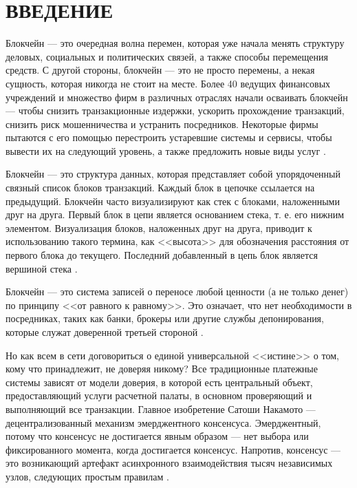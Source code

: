 \documentclass{bmstu}
\begin{document}
{\centering \chapter*{ВВЕДЕНИЕ}}

Блокчейн --- это очередная волна перемен, которая уже начала менять структуру
деловых, социальных и политических связей, а также способы перемещения
средств. 
С другой стороны, блокчейн --- это не просто перемены, а некая сущность, которая никогда не стоит на месте. 
Более 40 ведущих финансовых учреждений и множество фирм в различных отраслях начали осваивать блокчейн --- чтобы снизить транзакционные издержки, ускорить прохождение транзакций, снизить риск мошенничества и устранить посредников. 
Некоторые фирмы пытаются с его помощью перестроить устаревшие системы и сервисы, чтобы вывести их на следующий уровень, а также предложить новые виды услуг \cite[19]{Singhal2019}.

Блокчейн --- это структура данных, которая представляет собой упорядоченный связный список блоков транзакций. 
Каждый блок в цепочке ссылается на предыдущий. 
Блокчейн часто визуализируют как стек с блоками, наложенными друг на друга. 
Первый блок в цепи является основанием стека, т. е. его нижним элементом. 
Визуализация блоков, наложенных друг на друга, приводит к использованию такого термина, как <<высота>> для обозначения расстояния от первого блока до текущего. Последний добавленный в цепь блок является вершиной стека \cite[163]{Antonopoulos2010}.

Блокчейн --- это система записей о переносе любой ценности (а не только денег) по принципу <<от равного к равному>>. 
Это означает, что нет необходимости в посредниках, таких как банки, брокеры или другие службы депонирования, которые служат доверенной третьей стороной \cite[21]{Singhal2019}.

Но как всем в сети договориться о единой универсальной <<истине>> о том, кому что принадлежит, не доверяя никому? 
Все традиционные платежные системы зависят от модели доверия, в которой есть центральный объект, предоставляющий услуги расчетной палаты, в основном проверяющий и выполняющий все транзакции. 
Главное изобретение Сатоши Накамото --- децентрализованный механизм эмерджентного консенсуса. 
Эмерджентный, потому что консенсус не достигается явным образом --- нет выбора или фиксированного момента, когда достигается консенсус. 
Напротив, консенсус --- это возникающий артефакт асинхронного взаимодействия тысяч независимых узлов, следующих простым правилам \cite[181]{Antonopoulos2010}.
\end{document}
